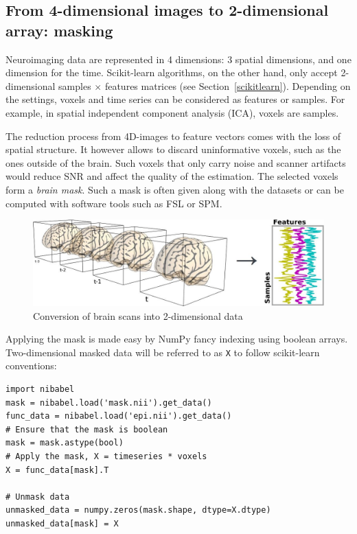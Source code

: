 \documentclass{frontiersSCNS} %
\begin{document}
\subsection{From 4-dimensional images to 2-dimensional array: masking}

\label{sec:unmasking}

Neuroimaging data are represented in 4 dimensions: 3 spatial dimensions, and 
one dimension for the time.
Scikit-learn algorithms, on the other hand, only accept 2-dimensional
samples $\times$ features matrices (see Section~\ref{scikitlearn}).
Depending on the settings, voxels and time series can be
considered as features
or samples. For example, in spatial independent component analysis (ICA),
voxels are samples.


The reduction process from 4D-images to feature vectors comes with the loss
of spatial structure. It however allows to discard uninformative
voxels, such as the ones outside of the brain. Such voxels that
only carry noise and scanner artifacts would reduce SNR and affect the
quality of the estimation. The selected voxels form a \emph{brain mask}.
Such a mask is often given along with the datasets or can be computed
with software tools such as FSL or SPM.

\begin{figure}[hbtp]
    \begin{center}
        \includegraphics[width=.5\linewidth]{img/niimgs.jpg}
    \end{center}
    \caption{Conversion of brain scans into 2-dimensional data}
    \label{fig:niimg}
\end{figure}

Applying the mask is made easy by NumPy fancy indexing using boolean arrays.
Two-dimensional masked data will be referred to as \texttt{X} to follow
scikit-learn conventions:
\begin{lstlisting}
import nibabel
mask = nibabel.load('mask.nii').get_data()
func_data = nibabel.load('epi.nii').get_data()
# Ensure that the mask is boolean
mask = mask.astype(bool)
# Apply the mask, X = timeseries * voxels
X = func_data[mask].T

# Unmask data
unmasked_data = numpy.zeros(mask.shape, dtype=X.dtype)
unmasked_data[mask] = X
\end{lstlisting}
\end{document}

